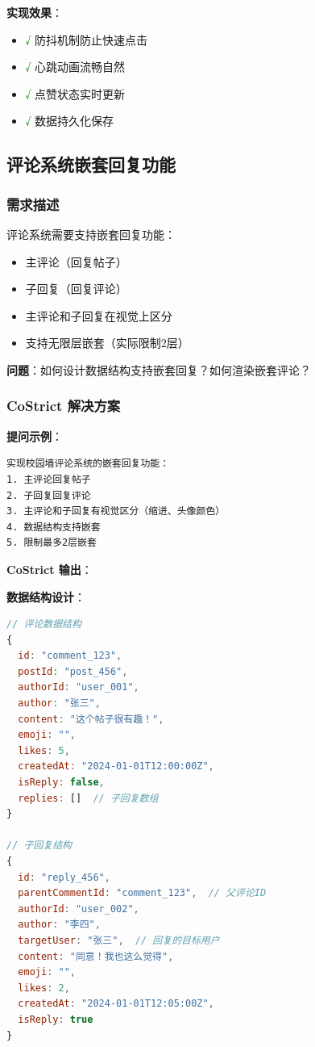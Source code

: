 ﻿\documentclass[12pt,a4paper]{article}
\begin{document}
\textbf{实现效果}：
\begin{itemize}
    \item \textcolor{green}{√} 防抖机制防止快速点击
    \item \textcolor{green}{√} 心跳动画流畅自然
    \item \textcolor{green}{√} 点赞状态实时更新
    \item \textcolor{green}{√} 数据持久化保存
\end{itemize}

\subsection{评论系统嵌套回复功能}

\subsubsection{需求描述}

评论系统需要支持嵌套回复功能：
\begin{itemize}
    \item 主评论（回复帖子）
    \item 子回复（回复评论）
    \item 主评论和子回复在视觉上区分
    \item 支持无限层嵌套（实际限制2层）
\end{itemize}

\textbf{问题}：如何设计数据结构支持嵌套回复？如何渲染嵌套评论？

\subsubsection{CoStrict 解决方案}

\textbf{提问示例}：
\begin{verbatim}
实现校园墙评论系统的嵌套回复功能：
1. 主评论回复帖子
2. 子回复回复评论
3. 主评论和子回复有视觉区分（缩进、头像颜色）
4. 数据结构支持嵌套
5. 限制最多2层嵌套
\end{verbatim}

\textbf{CoStrict 输出}：

\textbf{数据结构设计}：

\begin{lstlisting}[language=JavaScript, caption={评论数据结构}]
// 评论数据结构
{
  id: "comment_123",
  postId: "post_456",
  authorId: "user_001",
  author: "张三",
  content: "这个帖子很有趣！",
  emoji: "",
  likes: 5,
  createdAt: "2024-01-01T12:00:00Z",
  isReply: false,
  replies: []  // 子回复数组
}

// 子回复结构
{
  id: "reply_456",
  parentCommentId: "comment_123",  // 父评论ID
  authorId: "user_002",
  author: "李四",
  targetUser: "张三",  // 回复的目标用户
  content: "同意！我也这么觉得",
  emoji: "",
  likes: 2,
  createdAt: "2024-01-01T12:05:00Z",
  isReply: true
}
\end{lstlisting}
\end{document}
